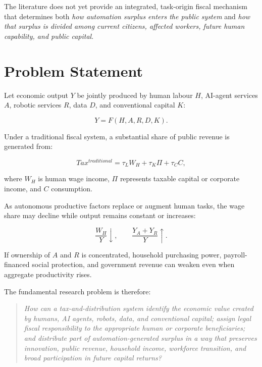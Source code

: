\documentclass[conference]{IEEEtran}
\begin{document}
The literature does not yet provide an integrated, task-origin fiscal mechanism
that determines both \textit{how automation surplus enters the public system}
and \textit{how that surplus is divided among current citizens, affected
workers, future human capability, and public capital}.

\section{Problem Statement}

Let economic output $Y$ be jointly produced by human labour $H$, AI-agent
services $A$, robotic services $R$, data $D$, and conventional capital $K$:

\begin{equation}
Y = F(H,A,R,D,K).
\end{equation}

Under a traditional fiscal system, a substantial share of public revenue is
generated from:

\begin{equation}
Tax^{traditional}
=
\tau_L W_H + \tau_K \Pi + \tau_C C,
\end{equation}

where $W_H$ is human wage income, $\Pi$ represents taxable capital or corporate
income, and $C$ consumption.

As autonomous productive factors replace or augment human tasks, the wage share
may decline while output remains constant or increases:

\begin{equation}
\frac{W_H}{Y} \downarrow,
\qquad
\frac{Y_A+Y_R}{Y} \uparrow.
\end{equation}

If ownership of $A$ and $R$ is concentrated, household purchasing power,
payroll-financed social protection, and government revenue can weaken even when
aggregate productivity rises.

The fundamental research problem is therefore:

\begin{quote}
\textit{How can a tax-and-distribution system identify the economic value
created by humans, AI agents, robots, data, and conventional capital; assign
legal fiscal responsibility to the appropriate human or corporate
beneficiaries; and distribute part of automation-generated surplus in a way
that preserves innovation, public revenue, household income, workforce
transition, and broad participation in future capital returns?}
\end{quote}
\end{document}

